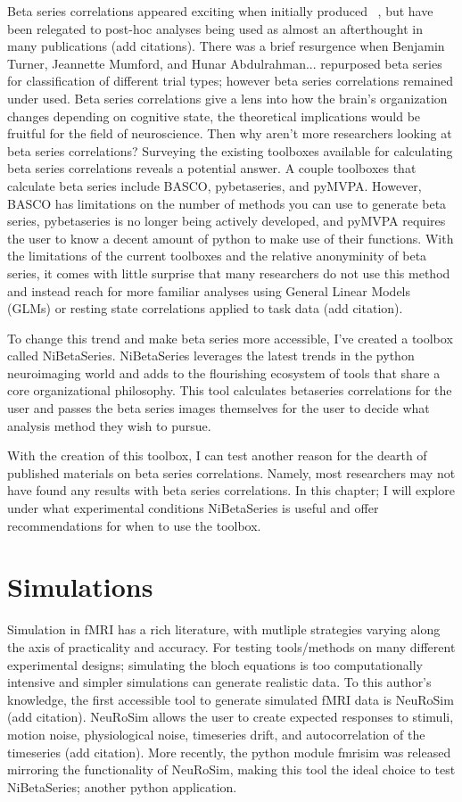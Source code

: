 \documentclass[phd,appendix,figures]{uithesis}
\begin{document}
Beta series correlations appeared exciting when initially produced ~\citep{Rissman2004},
but have been relegated to post-hoc analyses being used as almost an afterthought in many
publications (add citations).
There was a brief resurgence when Benjamin Turner, Jeannette Mumford, and Hunar Abdulrahman... repurposed
beta series for classification of different trial types; however beta series correlations
remained under used.
Beta series correlations give a lens into how the brain's organization changes depending
on cognitive state, the theoretical implications would be fruitful for the field of neuroscience.
Then why aren't more researchers looking at beta series correlations?
Surveying the existing toolboxes available for calculating beta series correlations reveals a
potential answer.
A couple toolboxes that calculate beta series include BASCO, pybetaseries, and pyMVPA.
However, BASCO has limitations on the number of methods you can use to generate beta series,
pybetaseries is no longer being actively developed, and pyMVPA requires the user to know
a decent amount of python to make use of their functions.
With the limitations of the current toolboxes and the relative anonyminity of beta series,
it comes with little surprise that many researchers do not use this method and instead reach for
more familiar analyses using General Linear Models (GLMs) or resting state correlations applied
to task data (add citation).

To change this trend and make beta series more accessible, I've created a toolbox called NiBetaSeries.
NiBetaSeries leverages the latest trends in the python neuroimaging world and adds to the flourishing
ecosystem of tools that share a core organizational philosophy.
This tool calculates betaseries correlations for the user and passes the beta series images themselves
for the user to decide what analysis method they wish to pursue.

With the creation of this toolbox, I can test another reason for the dearth of published materials on
beta series correlations.
Namely, most researchers may not have found any results with beta series correlations.
In this chapter; I will explore under what experimental conditions NiBetaSeries is useful and offer
recommendations for when to use the toolbox.

\section{Simulations}
Simulation in fMRI has a rich literature, with mutliple strategies varying along the axis
of practicality and accuracy.
For testing tools/methods on many different experimental designs; simulating the bloch equations
is too computationally intensive and simpler simulations can generate realistic data.
To this author's knowledge, the first accessible tool to generate simulated fMRI data is NeuRoSim (add citation).
NeuRoSim allows the user to create expected responses to stimuli, motion noise, physiological noise,
timeseries drift, and autocorrelation of the timeseries (add citation).
More recently, the python module fmrisim was released mirroring the functionality of NeuRoSim, making this tool
the ideal choice to test NiBetaSeries; another python application.
\end{document}
